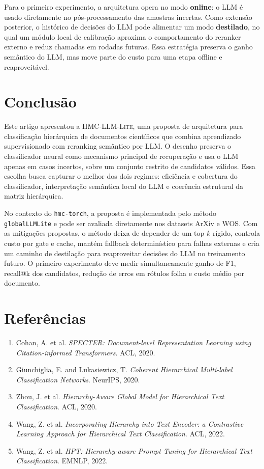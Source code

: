 \documentclass[11pt,a4paper]{article}
\newcommand{\method}{\textsc{HMC-LLM-Lite}}
\newcommand{\repo}{\texttt{hmc-torch}}
\begin{document}
Para o primeiro experimento, a arquitetura opera no modo \textbf{online}: o LLM
é usado diretamente no pós-processamento das amostras incertas. Como extensão
posterior, o histórico de decisões do LLM pode alimentar um modo
\textbf{destilado}, no qual um módulo local de calibração aproxima o
comportamento do reranker externo e reduz chamadas em rodadas futuras. Essa
estratégia preserva o ganho semântico do LLM, mas move parte do custo para uma
etapa offline e reaproveitável.

\section{Conclusão}

Este artigo apresentou a \method, uma proposta de arquitetura para classificação
hierárquica de documentos científicos que combina aprendizado supervisionado com
reranking semântico por LLM. O desenho preserva o classificador neural como
mecanismo principal de recuperação e usa o LLM apenas em casos incertos, sobre
um conjunto restrito de candidatos válidos. Essa escolha busca capturar o melhor
dos dois regimes: eficiência e cobertura do classificador, interpretação
semântica local do LLM e coerência estrutural da matriz hierárquica.

No contexto do \repo, a proposta é implementada pelo método
\texttt{globalLLMLite} e pode ser avaliada diretamente nos datasets ArXiv e WOS.
Com as mitigações propostas, o método deixa de depender de um top-$k$ rígido,
controla custo por gate e cache, mantém fallback determinístico para falhas
externas e cria um caminho de destilação para reaproveitar decisões do LLM no
treinamento futuro. O primeiro experimento deve medir simultaneamente ganho de
F1, recall@k dos candidatos, redução de erros em rótulos folha e custo médio por
documento.

\section*{Referências}

\begin{enumerate}[leftmargin=*, itemsep=2pt]
  \item Cohan, A. et al. \textit{SPECTER: Document-level Representation Learning
        using Citation-informed Transformers}. ACL, 2020.
  \item Giunchiglia, E. and Lukasiewicz, T. \textit{Coherent Hierarchical
        Multi-label Classification Networks}. NeurIPS, 2020.
  \item Zhou, J. et al. \textit{Hierarchy-Aware Global Model for Hierarchical
        Text Classification}. ACL, 2020.
  \item Wang, Z. et al. \textit{Incorporating Hierarchy into Text Encoder: a
        Contrastive Learning Approach for Hierarchical Text Classification}.
        ACL, 2022.
  \item Wang, Z. et al. \textit{HPT: Hierarchy-aware Prompt Tuning for
        Hierarchical Text Classification}. EMNLP, 2022.
\end{enumerate}
\end{document}
